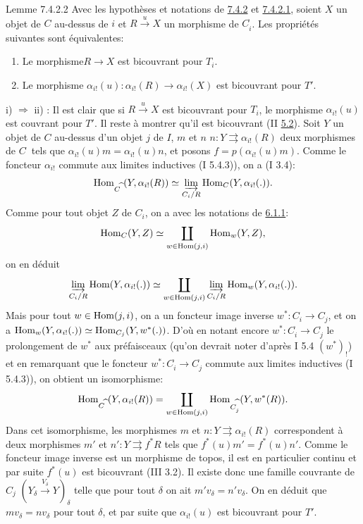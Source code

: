 \documentclass[10pt]{../fichiers-configuration-latex/smfart}
\begin{document}
\begin{enonce*}{Lemme 7.4.2.2}
Avec les hypothèses et notations de \hyperref[VI.prop7.4.2]{7.4.2} et \hyperref[VI.par7.4.2.1]{7.4.2.1}, soient $X$ un
objet de $C$ au-dessus de $i$ et $R \xrightarrow{u} X$ un morphisme de
$C^{\widehat{\phantom{,}}}_i$. Les propriétés suivantes sont
équivalentes:
\begin{enumerate}
\renewcommand{\theenumi}{\roman{enumi}}
\renewcommand{\labelenumi}{\theenumi)}
\item Le morphisme\pageoriginale $R \to X$ est bicouvrant pour $T_i$.

\item Le morphisme $\alpha_{i!}(u) : \alpha_{i!}(R) \to
  \alpha_{i!}(X)$ est bicouvrant pour $T'$.
\end{enumerate}
\end{enonce*}

i) $\Rightarrow$ ii) : Il est clair que si $R \xrightarrow{u} X$ est
bicouvrant pour $T_i$, le morphisme $\alpha_{i!} (u)$ est couvrant
pour $T'$. Il reste à montrer qu'il est bicouvrant (II \hyperref[VI.cor5.2]{5.2}). Soit $Y$
un objet de $C$ au-dessus d'un objet $j$ de $I$, $m$ et $n$ $n : Y
\rightrightarrows \alpha_{i!} (R)$ deux morphismes de
$C^{\widehat{\phantom{,}}}$ tels que $\alpha_{i!} (u) m = \alpha_{i!}
(u) n$, et posons $f = p(\alpha_{i!} (u)m)$. Comme le foncteur
$\alpha_{i!}$ commute aux limites inductives (I 5.4.3)), on a (I 3.4):
$$
\operatorname{Hom}_{C^{\widehat{\phantom{,}}}} (Y, \alpha_{i!} (R)) \simeq
\varinjlim_{C_{i}/R} \operatorname{Hom}_C (Y, \alpha_{i!} (.)){}.
$$
Comme pour tout objet $Z$ de $C_i$, on a avec les notations de \hyperref[VI.subsubsec6.1.1]{6.1.1}:
$$
\operatorname{Hom}_{C} (Y, Z) \simeq \coprod_{w \in \operatorname{Hom}(j, i)} \operatorname{Hom}_w (Y,
Z){},
$$
on en déduit
$$
\varinjlim_{C_{i}/R} \operatorname{Hom} (Y, \alpha_{i!} (.)) \simeq
\coprod_{w \in \operatorname{Hom}(j, i)} \varinjlim_{C_{i}/R}
\operatorname{Hom}_{w} (Y, \alpha_{i!} (.)){}.
$$
Mais pour tout $w \in \operatorname{Hom}(j, i)$, on a un foncteur image inverse
$w^{\ast} : C_i \to C_j$, et on a $\operatorname{Hom}_w (Y, \alpha_{i!} (.)) \simeq
\operatorname{Hom}_{C_{j}}(Y, w^{\ast} (.))$. D'où en notant encore $w^{\ast} :
C^{\widehat{\phantom{,}}}_i \to C^{\widehat{\phantom{,}}}_j$ le
prolongement de $w^{\ast}$ aux préfaisceaux (qu'on devrait noter
d'après I 5.4 $(w^{\ast})_{!}$) et en remarquant que le foncteur
$w^{\ast} : C^{\widehat{\phantom{,}}}_i \to
C^{\widehat{\phantom{,}}}_j$ commute aux limites inductives (I
5.4.3)), on obtient un isomorphisme:
$$
\operatorname{Hom}_{C^{\widehat{\phantom{,}}}} (Y, \alpha_{i!} (R)) =
\coprod_{w \in \operatorname{Hom}(j, i)}
\operatorname{Hom}_{C^{\widehat{\phantom{,}}}_{j}}(Y,w^{\ast}(R)){}.
$$
Dans cet isomorphisme, les morphismes $m$ et $n : Y \rightrightarrows
\alpha_{i!} (R)$ correspondent à deux morphismes $m'$ et $n': Y
\rightrightarrows f^{\ast} R$ tels que $f^{\ast} (u)m' = f^{\ast}
(u)n'$. Comme le foncteur image inverse est un morphisme de topos, il
est en particulier continu et par suite $f^{\ast}(u)$ est bicouvrant
(III 3.2). Il existe donc une famille couvrante de $C_j$ $(Y_{\delta}
\xrightarrow{V_{\delta}} Y)_{\delta}$ telle que pour tout $\delta$ on
ait $m' v_{\delta} = n' v_{\delta}$. On en déduit que $m v_{\delta} =
n v_{\delta}$ pour tout $\delta$, et par suite que $\alpha_{i!}(u)$
est bicouvrant pour $T'$.
\end{document}
